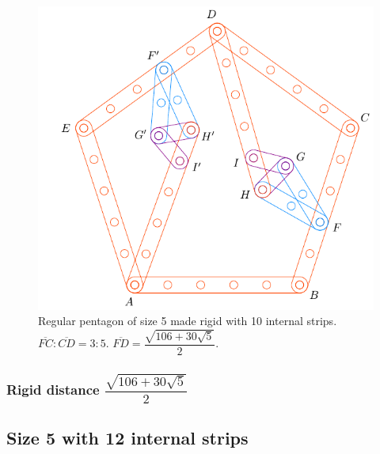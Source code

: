 \documentclass[11pt]{article}
\begin{document}
\begin{figure}[H]
\centering
\includegraphics[scale=0.9]{5/penta5-10a}
\caption{Regular pentagon of size 5 made rigid with 10 internal strips. $\overline{FC} : \overline{CD} = 3:5$. $\overline{FD} = \dfrac{\sqrt{106 + 30\sqrt5}}2$.}
\label{fig:penta5-10a}
\end{figure}

\subsubsection{Rigid distance $\dfrac{\sqrt{106 + 30\sqrt5}}2$}

\subsection{Size 5 with 12 internal strips}
\end{document}
